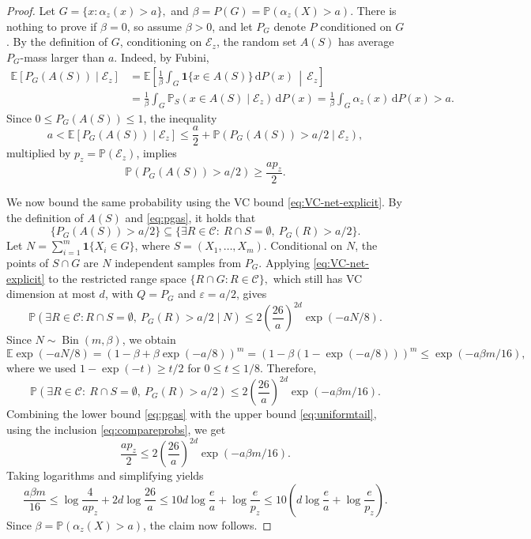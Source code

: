 \documentclass[11pt]{article}
\newcommand{\C}{\mathcal C}
\newcommand{\E}{\mathbb E}
\newcommand{\Prb}{\mathbb P}
\newcommand{\1}{\mathbf 1}
\theoremstyle{plain}
\theoremstyle{remark}
\begin{document}
\begin{proof}
Let
$
G=\{x:\alpha_z(x)>a\},$ and $\beta=P(G) = \Prb\left(\alpha_z(X)>a\right).
$
There is nothing to prove if $\beta=0$, so assume $\beta>0$, and let $P_G$ denote $P$ conditioned on $G$. By the definition of $G$, conditioning on $\mathcal E_z$, the random set $A(S)$ has average $P_G$-mass larger than $a$. Indeed, by Fubini,
\begin{align*}
\E\left[P_G(A(S))\mid \mathcal E_z\right]
&=
\E\left[\frac1\beta\int_G \mathbf 1\{x\in A(S)\}\,\mathrm dP(x)\,\middle|\,\mathcal E_z\right]
\\
&=
\frac1\beta\int_G \Prb_S(x\in A(S)\mid \mathcal E_z)\,\mathrm dP(x)
=
\frac1\beta\int_G \alpha_z(x)\,\mathrm dP(x)
>a.
\end{align*}
Since $0\le P_G(A(S)) \le 1$, the inequality
\[
a<\E[P_G(A(S))\mid\mathcal E_z]\le \frac a2+\Prb\left(P_G(A(S))>a/2\mid\mathcal E_z\right),
\]
multiplied by $p_z=\Prb(\mathcal E_z)$, implies
\begin{equation}
\label{eq:pgas}
\Prb\left(P_G(A(S))>a/2\right)
\ge
\frac{ap_z}{2}.
\end{equation}

We now bound the same probability using the VC bound \eqref{eq:VC-net-explicit}. By the definition of $A(S)$ and \eqref{eq:pgas}, it holds that
\begin{equation}
\label{eq:compareprobs}
\{P_G(A(S))>a/2\}
\subseteq
\{\exists R\in\C:\ R\cap S=\emptyset,\ P_G(R)>a/2\}.
\end{equation}
Let $N=\sum_{i=1}^m \mathbf 1\{X_i\in G\}$, where $S = (X_1, \ldots, X_m)$. Conditional on $N$, the points of $S\cap G$ are $N$ independent samples from $P_G$. Applying \eqref{eq:VC-net-explicit} to the restricted range space
$
\{R\cap G:R\in\C\},
$
which still has VC dimension at most $d$, with $Q=P_G$ and $\varepsilon=a/2$, gives
\[
\Prb\left(\exists R\in\C:R\cap S=\emptyset,\ P_G(R)>a/2\mid N\right)
\le
2\left(\frac{26}{a}\right)^{2d}\exp(-aN/8).
\]
Since $N\sim\operatorname{Bin}(m,\beta)$, we obtain
\[
\E\exp(-aN/8)
=
\left(1-\beta+\beta \exp(-a/8)\right)^m
=
\left(1-\beta(1-\exp(-a/8))\right)^m
\le
\exp(-a\beta m/16),
\]
where we used $1-\exp(-t)\ge t/2$ for $0\le t\le 1/8$. Therefore,
\begin{equation}
\label{eq:uniformtail}
\Prb\left(\exists R\in\C:\ R\cap S=\emptyset,\ P_G(R)>a/2\right)
\le
2\left(\frac{26}{a}\right)^{2d}\exp\left(-a\beta m/16\right).
\end{equation}
Combining the lower bound \eqref{eq:pgas} with the upper bound \eqref{eq:uniformtail}, using the inclusion \eqref{eq:compareprobs}, we get
\[
\frac{ap_z}{2}
\le
2\left(\frac{26}{a}\right)^{2d}\exp\left(-a\beta m/16\right).
\]
Taking logarithms and simplifying yields
\[
\frac{a\beta m}{16}
\le
\log\frac{4}{ap_z}+2d\log\frac{26}{a} \le 10d\log\frac ea+\log\frac e{p_z} \le 10\left(d\log\frac ea+\log\frac e{p_z}\right).
\]
Since $\beta = \Prb\left(\alpha_z(X)>a\right)$, the claim now follows.
\end{proof}
\end{document}

